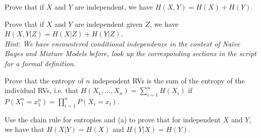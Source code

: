 \documentclass[a4paper,10pt,landscape,twocolumn]{scrartcl}
\begin{document}
\begin{exercise}
\begin{subex}
Prove that if $X$ and $Y$ are independent, we have $H(X,Y)=H(X) + H(Y)$. 
\end{subex}

\begin{subex}
Prove that if $X$ and $Y$ are independent given $Z$, we have $H(X,Y|Z)
= H(X|Z) + H(Y|Z)$. 
\\\emph{Hint: We have encountered conditional
independence in the context of Na{\"i}ve Bayes and Mixture Models
before, look up the corresponding sections in the script for a formal definition.}
\end{subex}

\begin{subex}
Prove that the entropy of $n$ independent RVs is the sum of the entropy of the individual RVs, i.e. that  $H(X_1, ..., X_n) = \sum_{i=1}^{n} H(X_{i}) $ if $P(X_1^n=x_1^n) = \prod_{i = 1}^n P(X_i=x_i)$.
\end{subex}

\begin{subex}
Use the chain rule for entropies and (a) to prove that for
  independent $X$ and $Y$, we have that $H(X|Y) = H(X)$ and $H(Y|X) = H(Y)$.
\end{subex}

\end{exercise}
\end{document}
